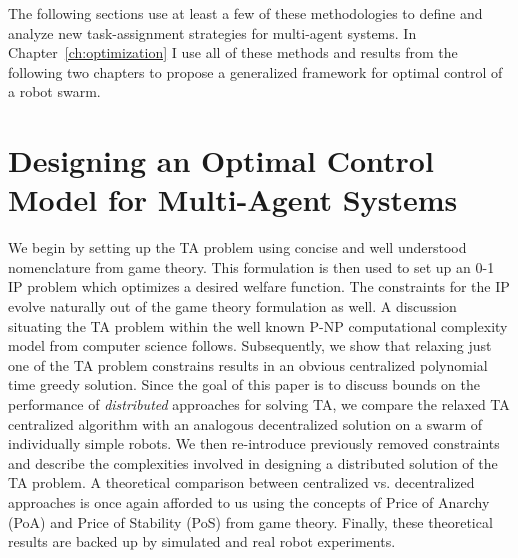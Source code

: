 \documentclass[defaultstyle,12pt]{thesis}
\begin{document}
The following sections use at least a few of these methodologies to define and analyze new task-assignment strategies for multi-agent systems. In Chapter~\ref{ch:optimization} I use all of these methods and results from the following two chapters to propose a generalized framework for optimal control of a robot swarm.


\chapter{Designing an Optimal Control Model for Multi-Agent Systems}\label{ch:model}
We begin by setting up the TA problem using concise and well understood nomenclature from game theory. This formulation is then used to set up an 0-1 IP problem which optimizes a desired welfare function. The constraints for the IP evolve naturally out of the game theory formulation as well. A discussion situating the TA problem within the well known P-NP computational complexity model from computer science follows. Subsequently, we show that relaxing just one of the TA problem constrains results in an obvious centralized polynomial time greedy solution. Since the goal of this paper is to discuss bounds on the performance of \emph{distributed} approaches for solving TA, we compare the relaxed TA centralized algorithm with an analogous decentralized solution on a swarm of individually simple robots. We then re-introduce previously removed constraints and describe the complexities involved in designing a distributed solution of the TA problem. A theoretical comparison between centralized vs. decentralized approaches is once again afforded to us using the concepts of Price of Anarchy (PoA) and Price of Stability (PoS) from game theory. Finally, these theoretical results are backed up by simulated and real robot experiments.

\end{document}
